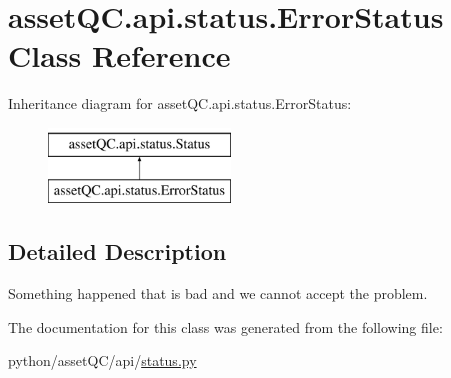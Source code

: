 \hypertarget{classassetQC_1_1api_1_1status_1_1ErrorStatus}{\section{asset\-Q\-C.\-api.\-status.\-Error\-Status \-Class \-Reference}
\label{d8/da6/classassetQC_1_1api_1_1status_1_1ErrorStatus}
}
\-Inheritance diagram for asset\-Q\-C.\-api.\-status.\-Error\-Status\-:\begin{figure}[H]
\begin{center}
\leavevmode
\includegraphics[height=2.000000cm]{d8/da6/classassetQC_1_1api_1_1status_1_1ErrorStatus}
\end{center}
\end{figure}


\subsection{\-Detailed \-Description}
\begin{DoxyVerb}
Something happened that is bad and we cannot accept the problem.
\end{DoxyVerb}
 

\-The documentation for this class was generated from the following file\-:\begin{DoxyCompactItemize}
\item 
python/asset\-Q\-C/api/\hyperlink{status_8py}{status.\-py}\end{DoxyCompactItemize}
